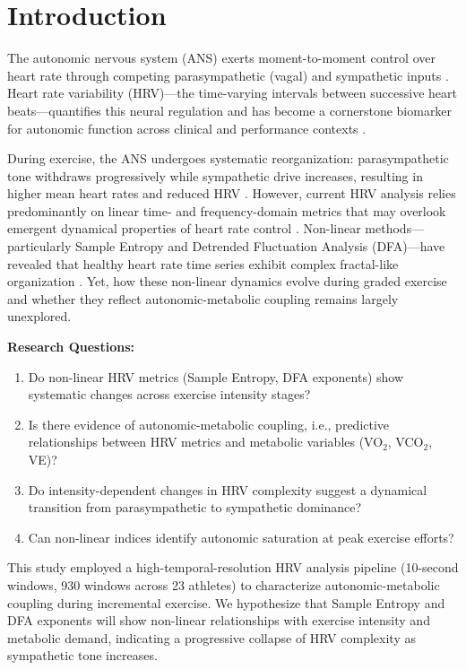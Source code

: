 \documentclass[12pt,a4paper]{article}
\begin{document}

\section*{Introduction}

The autonomic nervous system (ANS) exerts moment-to-moment control over heart rate through competing parasympathetic (vagal) and sympathetic inputs \cite{Malik1996}. Heart rate variability (HRV)—the time-varying intervals between successive heart beats—quantifies this neural regulation and has become a cornerstone biomarker for autonomic function across clinical and performance contexts \cite{TaskForce1996}.

During exercise, the ANS undergoes systematic reorganization: parasympathetic tone withdraws progressively while sympathetic drive increases, resulting in higher mean heart rates and reduced HRV \cite{Perini2002, Tulppo1998}. However, current HRV analysis relies predominantly on linear time- and frequency-domain metrics that may overlook emergent dynamical properties of heart rate control \cite{Ivanov1996}. Non-linear methods—particularly Sample Entropy and Detrended Fluctuation Analysis (DFA)—have revealed that healthy heart rate time series exhibit complex fractal-like organization \cite{Goldberger2002, Peng1994}. Yet, how these non-linear dynamics evolve during graded exercise and whether they reflect autonomic-metabolic coupling remains largely unexplored.

\textbf{Research Questions:}
\begin{enumerate}
    \item Do non-linear HRV metrics (Sample Entropy, DFA exponents) show systematic changes across exercise intensity stages?
    \item Is there evidence of autonomic-metabolic coupling, i.e., predictive relationships between HRV metrics and metabolic variables (VO$_2$, VCO$_2$, VE)?
    \item Do intensity-dependent changes in HRV complexity suggest a dynamical transition from parasympathetic to sympathetic dominance?
    \item Can non-linear indices identify autonomic saturation at peak exercise efforts?
\end{enumerate}

This study employed a high-temporal-resolution HRV analysis pipeline (10-second windows, 930 windows across 23 athletes) to characterize autonomic-metabolic coupling during incremental exercise. We hypothesize that Sample Entropy and DFA exponents will show non-linear relationships with exercise intensity and metabolic demand, indicating a progressive collapse of HRV complexity as sympathetic tone increases.
\end{document}
